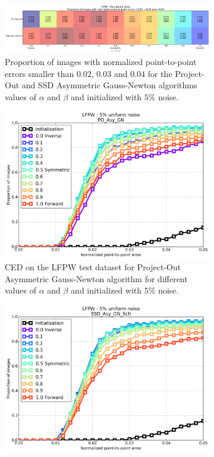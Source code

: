 \begin{figure}[h!]
	\centering
	\begin{subfigure}{\textwidth}
	    \includegraphics[width=\textwidth]{experiments/alpha/asy_gn_vs_alpha_5.png}
	    \caption{Proportion of images with normalized point-to-point errors smaller than $0.02$, $0.03$ and $0.04$ for the Project-Out and SSD Asymmetric Gauss-Newton algorithms values of $\alpha$ and $\beta$ and initialized with $5\%$ noise.}
	    \label{fig:asy_gn_vs_alpha_5}
	\end{subfigure}
	\par\bigskip\bigskip
	\begin{subfigure}{0.48\textwidth}
	    \includegraphics[width=\textwidth]{experiments/alpha/ced_po_asy_gn_5.png}
	    \caption{CED on the LFPW test dataset for Project-Out Asymmetric Gauss-Newton algorithm for different values of $\alpha$ and $\beta$ and initialized with $5\%$ noise.}
	    \label{fig:ced_po_asy_gn_5}
	\end{subfigure}
	\hfill
	\begin{subfigure}{0.48\textwidth}
	    \includegraphics[width=\textwidth]{experiments/alpha/ced_ssd_asy_gn_5.png}

\end{subfigure}
\end{figure}
